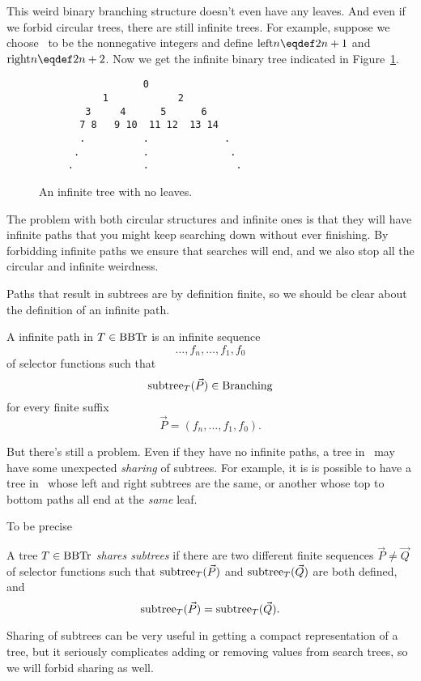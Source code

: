 This weird binary branching structure doesn't even have any leaves.
\fi
And even if we forbid circular trees, there are still infinite
trees.  For example, suppose we choose \brnch\ to be the nonnegative
integers and define $\leftsub{n} \eqdef 2n+1$ and $\rightsub{n} \eqdef
2n+2$.  Now we get the infinite binary tree indicated in
Figure~\ref{inftree123}.


\begin{figure}


\begin{verbatim}
                  0
           1            2
        3     4      5      6
       7 8   9 10  11 12  13 14
       .          .             . 
      .           .              .
     .            .               . 

\end{verbatim}

\caption{An infinite tree with no leaves.}

\label{inftree123}

\end{figure}

The problem with both circular structures and infinite ones is that
they will have infinite paths that you might keep searching down
without ever finishing.  By forbidding infinite paths we ensure that
searches will end, and we also stop all the circular and infinite
weirdness.

Paths that result in subtrees are by definition finite, so we should
be clear about the definition of an infinite path.

\begin{definition}
A infinite path in $T \in \text{BBTr}$ is an infinite sequence
\[
\dots,f_n,\dots,f_1,f_0
\]
of selector functions such that
\[
\text{subtree}_{T}(\vec{P}) \in \text{Branching}
\]
for every finite suffix
\[
\vec{P} = (f_n,\dots, f_1,f_0).
\]
\end{definition}

But there's still a problem.  Even if they
have no infinite paths, a tree in \brnch\ may have some unexpected
\emph{sharing} of subtrees.  For example, it is is possible to have a
tree in \brnch\ whose left and right subtrees are the same, or
another whose top to bottom paths all end at the \emph{same} leaf.

To be precise
\begin{definition}
A tree $T \in \text{BBTr}$ \emph{shares subtrees} if there are two different
finite sequences $\vec{P} \neq \vec{Q}$ of selector functions such that
$\text{subtree}_{T}(\vec{P})$ and $\text{subtree}_{T}(\vec{Q})$ are both defined, and
\[
\text{subtree}_{T}(\vec{P})=\text{subtree}_{T}(\vec{Q}).
\]
\end{definition}
Sharing of subtrees can be very useful in getting a compact
representation of a tree, but it seriously complicates adding or
removing values from search trees, so we will forbid sharing as well.

